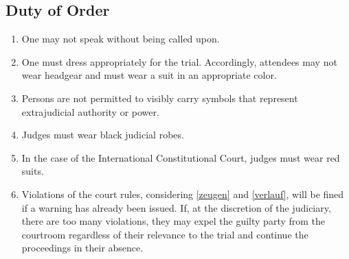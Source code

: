 \documentclass{article}
\begin{document}
\subsection{Duty of Order}\label{gordnung}
\begin{enumerate}[(1)]
    \item One may not speak without being called upon.
    \item One must dress appropriately for the trial. Accordingly, attendees may not wear headgear and must wear a suit in an appropriate color.
    \item Persons are not permitted to visibly carry symbols that represent extrajudicial authority or power.
    \item Judges must wear black judicial robes.
    \item In the case of the International Constitutional Court, judges must wear red suits.
    \item Violations of the court rules, considering \ref{zeugen} and \ref{verlauf}, will be fined if a warning has already been issued. If, at the discretion of the judiciary, there are too many violations, they may expel the guilty party from the courtroom regardless of their relevance to the trial and continue the proceedings in their absence.
\end{enumerate}
\end{document}
